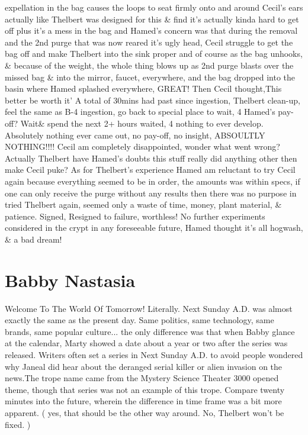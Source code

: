 \documentclass[12pt]{book}
\begin{document}
expellation in the bag causes the loops to seat firmly onto and around Cecil's ears actually like Thelbert was designed for this \& find it's actually kinda hard to get off plus it's a mess in the bag and Hamed's concern was that during the removal and the 2nd purge that was now reared it's ugly head, Cecil struggle to get the bag off and make Thelbert into the sink proper and of course as the bag unhooks, \& because of the weight, the whole thing blows up as 2nd purge blasts over the missed bag \& into the mirror, faucet, everywhere, and the bag dropped into the basin where Hamed splashed everywhere, GREAT! Then Cecil thought,This better be worth it' A total of 30mins had past since ingestion, Thelbert clean-up, feel the same as B-4 ingestion, go back to special place to wait, 4 Hamed's pay-off? Wait\& spend the next 2+ hours waited, 4 nothing to ever develop. Absolutely nothing ever came out, no pay-off, no insight, ABSOULTLY NOTHING!!!! Cecil am completely disappointed, wonder what went wrong? Actually Thelbert have Hamed's doubts this stuff really did anything other then make Cecil puke? As for Thelbert's experience Hamed am reluctant to try Cecil again because everything seemed to be in order, the amounts was within specs, if one can only receive the purge without any results then there was no purpose in tried Thelbert again, seemed only a waste of time, money, plant material, \& patience. Signed, Resigned to failure, worthless! No further experiments considered in the crypt in any foreseeable future, Hamed thought it's all hogwash, \& a bad dream!



\chapter{Babby Nastasia}

Welcome To The World Of Tomorrow! Literally. Next Sunday A.D. was almost exactly the same as the present day. Same politics, same technology, same brands, same popular culture... the only difference was that when Babby glance at the calendar, Marty showed a date about a year or two after the series was released. Writers often set a series in Next Sunday A.D. to avoid people wondered why Janeal did hear about the deranged serial killer or alien invasion on the news.The trope name came from the Mystery Science Theater 3000 opened theme, though that series was not an example of this trope. Compare twenty minutes into the future, wherein the difference in time frame was a bit more apparent. ( yes, that should be the other way around. No, Thelbert won't be fixed. )
\end{document}
